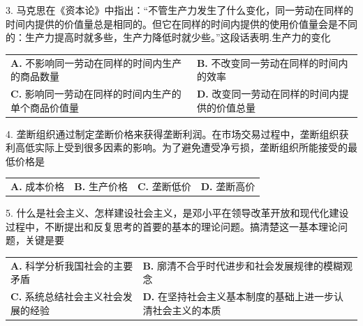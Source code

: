 \documentclass[UTF8,11pt]{ctexart}
\begin{document}
3. 马克思在《资本论》中指出：“不管生产力发生了什么变化，同一劳动在同样的时间内提供的价值量总是相同的。但它在同样的时间内提供的使用价值量会是不同的：生产力提高时就多些，生产力降低时就少些。”这段话表明.生产力的变化


\begin{center}\begin{tabular}{>{\raggedright\arraybackslash}p{\dimexpr(\linewidth-4\tabcolsep)/2\relax}>{\raggedright\arraybackslash}p{\dimexpr(\linewidth-4\tabcolsep)/2\relax}}
\textbf{A.} 不影响同一劳动在同样的时间内生产的商品数量 & \textbf{B.} 不改变同一劳动在同样的时间内的效率\\[.35em]
\textbf{C.} 影响同一劳动在同样的时间内生产的单个商品价值量 & \textbf{D.} 改变同一劳动在同样的时间内提供的价值总量\\[.35em]\end{tabular}\end{center}

4. 垄断组织通过制定垄断价格来获得垄断利润。在市场交易过程中，垄断组织获利高低实际上受到很多因素的影响。为了避免遭受净亏损，垄断组织所能接受的最低价格是


\begin{center}\begin{tabular}{>{\raggedright\arraybackslash}p{\dimexpr(\linewidth-8\tabcolsep)/4\relax}>{\raggedright\arraybackslash}p{\dimexpr(\linewidth-8\tabcolsep)/4\relax}>{\raggedright\arraybackslash}p{\dimexpr(\linewidth-8\tabcolsep)/4\relax}>{\raggedright\arraybackslash}p{\dimexpr(\linewidth-8\tabcolsep)/4\relax}}
\textbf{A.} 成本价格 & \textbf{B.} 生产价格 & \textbf{C.} 垄断低价 & \textbf{D.} 垄断高价\\[.35em]\end{tabular}\end{center}

5. 什么是社会主义、怎样建设社会主义，是邓小平在领导改革开放和现代化建设过程中，不断提出和反复思考的首要的基本的理论问题。搞清楚这一基本理论问题，关键是要


\begin{center}\begin{tabular}{>{\raggedright\arraybackslash}p{\dimexpr(\linewidth-4\tabcolsep)/2\relax}>{\raggedright\arraybackslash}p{\dimexpr(\linewidth-4\tabcolsep)/2\relax}}
\textbf{A.} 科学分析我国社会的主要矛盾 & \textbf{B.} 廓清不合乎时代进步和社会发展规律的模糊观念\\[.35em]
\textbf{C.} 系统总结社会主义社会发展的经验 & \textbf{D.} 在坚持社会主义基本制度的基础上进一步认清社会主义的本质\\[.35em]\end{tabular}\end{center}
\end{document}
